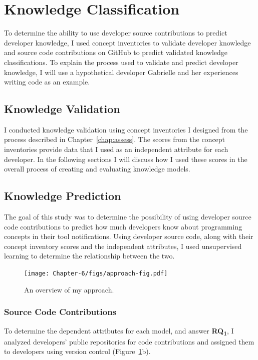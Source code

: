 \section{Knowledge Classification}

To determine the ability to use developer source contributions to predict developer knowledge, I used concept inventories to validate developer knowledge and source code contributions on GitHub to predict validated knowledge classifications.
To explain the process used to validate and predict developer knowledge, I will use a hypothetical developer Gabrielle and her experiences writing code as an example.

\subsection{Knowledge Validation}

I conducted knowledge validation using concept inventories I designed from the process described in Chapter~\ref{chap:assess}.
The scores from the concept inventories provide data that I used as an independent attribute for each developer. 
In the following sections I will discuss how I used these scores in the overall process of creating and evaluating knowledge models. 

\subsection{Knowledge Prediction}
The goal of this study was to determine the possibility of using developer source code contributions to predict how much developers know about programming concepts in their tool notifications.
Using developer source code, along with their concept inventory scores and the independent attributes, I used unsupervised learning to determine the relationship between the two.

\begin{figure} [ht]
	\centering
	\texttt{[image: Chapter-6/figs/approach-fig.pdf]}
	\caption{An overview of my approach.}
	\label{fig:approach}
\end{figure}

\subsubsection*{Source Code Contributions} \label{subsec:code}

To determine the dependent attributes for each model, and answer \textbf{RQ\textsubscript{1}}, I analyzed developers' public repositories for code contributions and assigned them to developers using version control (Figure~\ref{fig:approach}b).

